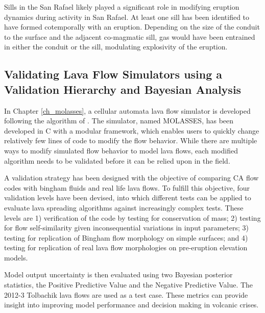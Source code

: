 Sills in the San Rafael likely played a significant role in modifying eruption dynamics during activity in San Rafael. At least one sill has been identified to have formed cotemporally with an eruption. Depending on the size of the conduit to the surface and the adjacent co-magmatic sill, gas would have been entrained in either the conduit or the sill, modulating explosivity of the eruption.

\subsection{Validating Lava Flow Simulators using a Validation Hierarchy and Bayesian Analysis}
In Chapter \ref{ch_molasses}, a cellular automata lava flow simulator is developed following the algorithm of \citet{connor2012probabilistic}. The simulator, named MOLASSES, has been developed in C with a modular framework, which enables users to quickly change relatively few lines of code to modify the flow behavior. While there are multiple ways to modify simulated flow behavior to model lava flows, each modified algorithm needs to be validated before it can be relied upon in the field. 

A validation strategy has been designed with the objective of comparing CA flow codes with bingham fluids and real life lava flows. To fulfill this objective, four validation levels have been devised, into which different tests can be applied to evaluate lava spreading algorithms against increasingly complex tests. These levels are 1) verification of the code by testing for conservation of mass; 2) testing for flow self-similarity given inconsequential variations in input parameters; 3) testing for replication of Bingham flow morphology on simple surfaces; and 4) testing for replication of real lava flow morphologies on pre-eruption elevation models. 

Model output uncertainty is then evaluated using two Bayesian posterior statistics, the Positive Predictive Value and the Negative Predictive Value. The 2012-3 Tolbachik lava flows are used as a test case. These metrics can provide insight into improving model performance and decision making in volcanic crises.

